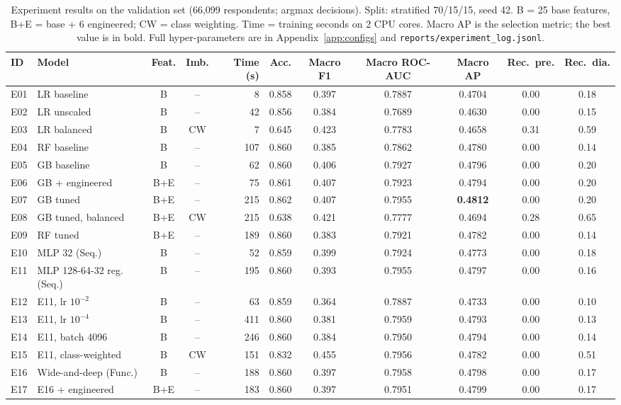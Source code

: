 \begin{table}[t]
\centering\footnotesize
\caption{Experiment results on the validation set (66,099 respondents; argmax decisions). Split: stratified 70/15/15, seed 42. B = 25 base features, B+E = base + 6 engineered; CW = class weighting. Time = training seconds on 2 CPU cores. Macro AP is the selection metric; the best value is in bold. Full hyper-parameters are in Appendix~\ref{app:configs} and \texttt{reports/experiment\_log.jsonl}.}
\label{tab:experiments}
\begin{tabular}{@{}llccrcccccc@{}}
\toprule
ID & Model & Feat. & Imb. & Time (s) & Acc. & Macro F1 & Macro ROC-AUC & Macro AP & Rec.\ pre. & Rec.\ dia.\\
\midrule
E01 & LR baseline & B & -- & 8 & 0.858 & 0.397 & 0.7887 & 0.4704 & 0.00 & 0.18 \\
E02 & LR unscaled & B & -- & 42 & 0.856 & 0.384 & 0.7689 & 0.4630 & 0.00 & 0.15 \\
E03 & LR balanced & B & CW & 7 & 0.645 & 0.423 & 0.7783 & 0.4658 & 0.31 & 0.59 \\
E04 & RF baseline & B & -- & 107 & 0.860 & 0.385 & 0.7862 & 0.4780 & 0.00 & 0.14 \\
E05 & GB baseline & B & -- & 62 & 0.860 & 0.406 & 0.7927 & 0.4796 & 0.00 & 0.20 \\
E06 & GB + engineered & B+E & -- & 75 & 0.861 & 0.407 & 0.7923 & 0.4794 & 0.00 & 0.20 \\
E07 & GB tuned & B+E & -- & 215 & 0.862 & 0.407 & 0.7955 & \textbf{0.4812} & 0.00 & 0.20 \\
E08 & GB tuned, balanced & B+E & CW & 215 & 0.638 & 0.421 & 0.7777 & 0.4694 & 0.28 & 0.65 \\
E09 & RF tuned & B+E & -- & 189 & 0.860 & 0.383 & 0.7921 & 0.4782 & 0.00 & 0.14 \\
E10 & MLP 32 (Seq.) & B & -- & 52 & 0.859 & 0.399 & 0.7924 & 0.4773 & 0.00 & 0.18 \\
E11 & MLP 128-64-32 reg. (Seq.) & B & -- & 195 & 0.860 & 0.393 & 0.7955 & 0.4797 & 0.00 & 0.16 \\
E12 & E11, lr $10^{-2}$ & B & -- & 63 & 0.859 & 0.364 & 0.7887 & 0.4733 & 0.00 & 0.10 \\
E13 & E11, lr $10^{-4}$ & B & -- & 411 & 0.860 & 0.381 & 0.7959 & 0.4793 & 0.00 & 0.13 \\
E14 & E11, batch 4096 & B & -- & 246 & 0.860 & 0.384 & 0.7950 & 0.4794 & 0.00 & 0.14 \\
E15 & E11, class-weighted & B & CW & 151 & 0.832 & 0.455 & 0.7956 & 0.4782 & 0.00 & 0.51 \\
E16 & Wide-and-deep (Func.) & B & -- & 188 & 0.860 & 0.397 & 0.7958 & 0.4798 & 0.00 & 0.17 \\
E17 & E16 + engineered & B+E & -- & 183 & 0.860 & 0.397 & 0.7951 & 0.4799 & 0.00 & 0.17 \\
\bottomrule
\end{tabular}
\end{table}
